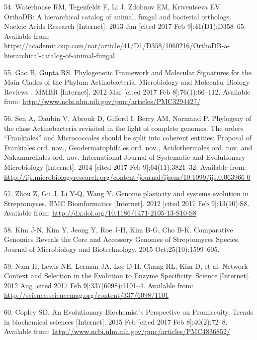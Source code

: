 \documentclass[12pt,twoside]{reedthesis}
\begin{document}
{  \hypertarget{ref-waterhouse_orthodb_2013}{}
  54. Waterhouse RM, Tegenfeldt F, Li J, Zdobnov EM, Kriventseva EV.
  OrthoDB: A hierarchical catalog of animal, fungal and bacterial
  orthologs. Nucleic Acids Research {[}Internet{]}. 2013 Jan {[}cited 2017
  Feb 9{]};41(D1):D358--65. Available from:
  \url{https://academic.oup.com/nar/article/41/D1/D358/1060216/OrthoDB-a-hierarchical-catalog-of-animal-fungal}
  
  \hypertarget{ref-gao_phylogenetic_2012}{}
  55. Gao B, Gupta RS. Phylogenetic Framework and Molecular Signatures for
  the Main Clades of the Phylum Actinobacteria. Microbiology and Molecular
  Biology Reviews : MMBR {[}Internet{]}. 2012 Mar {[}cited 2017 Feb
  8{]};76(1):66--112. Available from:
  \url{http://www.ncbi.nlm.nih.gov/pmc/articles/PMC3294427/}
  
  \hypertarget{ref-sen_phylogeny_2014}{}
  56. Sen A, Daubin V, Abrouk D, Gifford I, Berry AM, Normand P. Phylogeny
  of the class Actinobacteria revisited in the light of complete genomes.
  The orders ``Frankiales'' and Micrococcales should be split into
  coherent entities: Proposal of Frankiales ord. nov., Geodermatophilales
  ord. nov., Acidothermales ord. nov. and Nakamurellales ord. nov.
  International Journal of Systematic and Evolutionary Microbiology
  {[}Internet{]}. 2014 {[}cited 2017 Feb 9{]};64(11):3821--32. Available
  from:
  \url{http://ijs.microbiologyresearch.org/content/journal/ijsem/10.1099/ijs.0.063966-0}
  
  \hypertarget{ref-zhou_genome_2012}{}
  57. Zhou Z, Gu J, Li Y-Q, Wang Y. Genome plasticity and systems
  evolution in Streptomyces. BMC Bioinformatics {[}Internet{]}. 2012
  {[}cited 2017 Feb 9{]};13(10):S8. Available from:
  \url{http://dx.doi.org/10.1186/1471-2105-13-S10-S8}
  
  \hypertarget{ref-kim_comparative_2015}{}
  58. Kim J-N, Kim Y, Jeong Y, Roe J-H, Kim B-G, Cho B-K. Comparative
  Genomics Reveals the Core and Accessory Genomes of Streptomyces Species.
  Journal of Microbiology and Biotechnology. 2015 Oct;25(10):1599--605.
  
  \hypertarget{ref-nam_network_2012}{}
  59. Nam H, Lewis NE, Lerman JA, Lee D-H, Chang RL, Kim D, et al. Network
  Context and Selection in the Evolution to Enzyme Specificity. Science
  {[}Internet{]}. 2012 Aug {[}cited 2017 Feb 9{]};337(6098):1101--4.
  Available from:
  \url{http://science.sciencemag.org/content/337/6098/1101}
  
  \hypertarget{ref-copley_evolutionary_2015}{}
  60. Copley SD. An Evolutionary Biochemist's Perspective on Promiscuity.
  Trends in biochemical sciences {[}Internet{]}. 2015 Feb {[}cited 2017
  Feb 8{]};40(2):72--8. Available from:
  \url{http://www.ncbi.nlm.nih.gov/pmc/articles/PMC4836852/}
  
}
\end{document}
